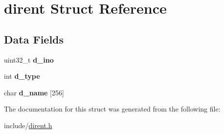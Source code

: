 \hypertarget{structdirent}{}\section{dirent Struct Reference}
\label{structdirent}
\subsection*{Data Fields}
\begin{DoxyCompactItemize}
\item 
\mbox{\label{structdirent_a0ed2e5ea3c71500f628914bf3966e4ba}} 
uint32\+\_\+t {\bfseries d\+\_\+ino}
\item 
\mbox{\label{structdirent_ad6a736cb04c7295e8f97f708324b3500}} 
int {\bfseries d\+\_\+type}
\item 
\mbox{\label{structdirent_ae52d525c8057131d7f1155fe7039910d}} 
char {\bfseries d\+\_\+name} \mbox{[}256\mbox{]}
\end{DoxyCompactItemize}


The documentation for this struct was generated from the following file\+:\begin{DoxyCompactItemize}
\item 
include/\mbox{\hyperlink{dirent_8h}{dirent.\+h}}\end{DoxyCompactItemize}
